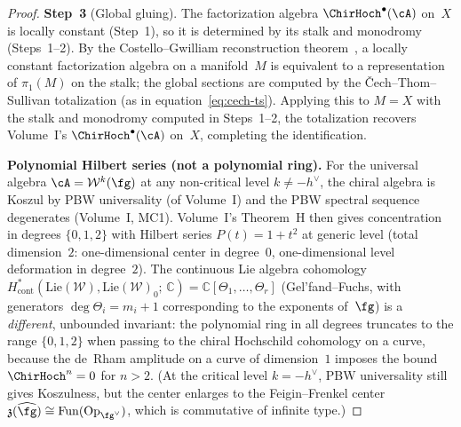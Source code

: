 \begin{proof}
\medskip
\noindent\textbf{Step~3} (Global gluing).
The factorization algebra $\ChirHoch^\bullet(\cA)$ on~$X$ is
locally constant (Step~1), so it is determined by its stalk and
monodromy (Steps~1--2). By the Costello--Gwilliam reconstruction
theorem~\cite[Chapter~6]{CG17}, a locally constant factorization
algebra on a manifold~$M$ is equivalent to a representation of
$\pi_1(M)$ on the stalk; the global sections are computed by the
\v{C}ech--Thom--Sullivan totalization (as in
equation~\eqref{eq:cech-ts}). Applying this to $M = X$ with the
stalk and monodromy computed in Steps~1--2, the totalization
recovers Volume~I's $\ChirHoch^\bullet(\cA)$ on~$X$, completing
the identification.

\medskip
\noindent\textbf{Polynomial Hilbert series (not a polynomial ring).}
For the universal algebra $\cA = \mathcal{W}^k(\fg)$ at any
non-critical level $k \neq -h^\vee$,
the chiral algebra is Koszul by PBW universality
(of Volume~I) and the PBW
spectral sequence degenerates (Volume~I, MC1). Volume~I's
Theorem~H then gives concentration in degrees $\{0,1,2\}$
with Hilbert series $P(t) = 1 + t^2$ at generic level
(total dimension~$2$: one-dimensional center in degree~$0$,
one-dimensional level deformation in degree~$2$).
The continuous Lie algebra cohomology
$H^*_{\mathrm{cont}}(\mathrm{Lie}(\mathcal{W}),
\mathrm{Lie}(\mathcal{W})_0;\,\mathbb{C})
= \mathbb{C}[\Theta_1, \ldots, \Theta_r]$
(Gel'fand--Fuchs, with generators $\deg \Theta_i = m_i + 1$
corresponding to the exponents of~$\fg$) is a
\emph{different}, unbounded invariant: the polynomial ring in
all degrees truncates to the range $\{0,1,2\}$ when passing to
the chiral Hochschild cohomology on a curve, because the
de~Rham amplitude on a curve of dimension~$1$ imposes the bound
$\ChirHoch^n = 0$ for $n > 2$.
(At the critical level $k = -h^\vee$, PBW universality
still gives Koszulness, but the center enlarges to the
Feigin--Frenkel center $\mathfrak{z}(\widehat{\fg})
\cong \operatorname{Fun}(\operatorname{Op}_{\fg^\vee})$,
which is commutative of infinite type.)
\end{proof}

